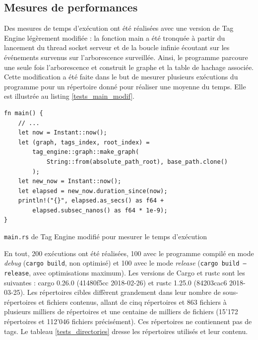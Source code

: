 \subsection{Mesures de performances}\label{mesures_performances}
Des mesures de temps d'exécution ont été réalisées avec une version de Tag Engine légèrement modifiée :
la fonction main a été tronquée à partir du lancement du thread socket serveur et de la boucle infinie 
écoutant sur les événements survenus sur l'arborescence surveillée. Ainsi, le programme parcoure 
une seule fois l'arborescence et construit le graphe et la table de hachage associée. Cette modification 
a été faite dans le but de mesurer plusieurs exécutions du programme pour un répertoire donné pour 
réaliser une moyenne du temps. Elle est illustrée au listing \ref{tests_main_modif}. 
\bigbreak
\begin{code}
    \begin{verbatim}
fn main() {
    // ...
    let now = Instant::now();
    let (graph, tags_index, root_index) = 
        tag_engine::graph::make_graph(
            String::from(absolute_path_root), base_path.clone()
        );
    let new_now = Instant::now();
    let elapsed = new_now.duration_since(now);
    println!("{}", elapsed.as_secs() as f64 + 
        elapsed.subsec_nanos() as f64 * 1e-9);
}
    \end{verbatim}
    \caption{\texttt{main.rs} de Tag Engine modifié pour mesurer le temps d'exécution}
    \label{tests_main_modif}
\end{code}
\bigbreak
En tout, 200 exécutions ont été réalisées, 100 avec le programme compilé 
en mode \textit{debug} (\texttt{cargo build}, non optimisé) et 100 avec le mode 
\textit{release} (\texttt{cargo build --release}, avec optimisations maximum).
Les versions de Cargo et rustc sont les suivantes : cargo 0.26.0 (41480f5cc 2018-02-26) et rustc 1.25.0 (84203cac6 2018-03-25).
Les répertoires cibles diffèrent grandement dans leur nombre de sous-répertoires et fichiers contenus, allant 
de cinq répertoires et 863 fichiers à plusieurs milliers de répertoires et une centaine de milliers 
de fichiers (15'172 répertoires et 112'046 fichiers précisément). Ces répertoires ne contiennent 
pas de tags. Le tableau \ref{tests_directories} dresse les répertoires utilisés et leur contenu.
